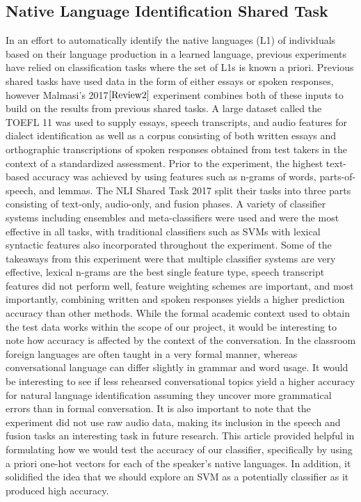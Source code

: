 \documentclass[12pt]{article}
\newcommand\tab[1][1cm]{\hspace*{#1}}
\begin{document}
\subsection{Native Language Identification Shared Task}
 \tab In an effort to automatically identify the native languages (L1) of individuals based on their language production in a learned language, previous experiments have relied on classification tasks where the set of L1s is known a priori. Previous shared tasks have used data in the form of either essays or spoken responses, however Malmasi's 2017$\cite{Review2}$ experiment combines both of these inputs to build on the results from previous shared tasks. A large dataset called the TOEFL 11 was used to supply essays, speech transcripts, and audio features for dialect identification as well as a corpus consisting of both written essays and orthographic transcriptions of spoken responses obtained from test takers in the context of a standardized assessment. Prior to the experiment, the highest text-based accuracy was achieved by using features such as n-grams of words, parts-of-speech, and lemmas. The NLI Shared Task 2017 split their tasks into three parts consisting of text-only, audio-only, and fusion phases. A variety of classifier systems including ensembles and meta-classifiers were used and were the most effective in all tasks, with traditional classifiers such as SVMs with lexical syntactic features also incorporated throughout the experiment. Some of the takeaways from this experiment were that multiple classifier systems are very effective, lexical n-grams are the best single feature type, speech transcript features did not perform well, feature weighting schemes are important, and most importantly, combining written and spoken responses yields a higher prediction accuracy than other methods. While the formal academic context used to obtain the test data works within the scope of our project, it would be interesting to note how accuracy is affected by the context of the conversation. In the classroom foreign languages are often taught in a very formal manner, whereas conversational language can differ slightly in grammar and word usage. It would be interesting to see if less rehearsed conversational topics yield a higher accuracy for natural language identification assuming they uncover more grammatical errors than in formal conversation. It is also important to note that the experiment did not use raw audio data, making its inclusion in the speech and fusion tasks an interesting task in future research. This article provided helpful in formulating how we would test the accuracy of our classifier, specifically by using a priori one-hot vectors for each of the speaker's native languages. In addition, it solidified the idea that we should explore an SVM as a potentially classifier as it produced high accuracy.
\end{document}

